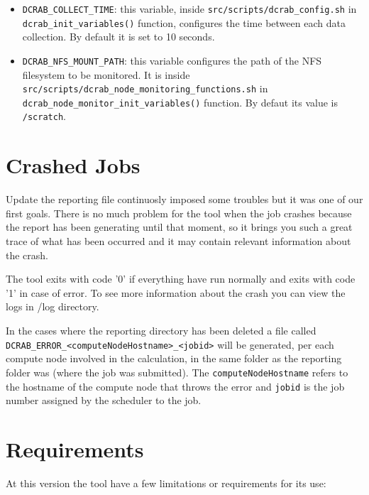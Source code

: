 \documentclass[10pt,a4paper]{report}
\begin{document}
\begin{itemize}
	\item \texttt{DCRAB\_COLLECT\_TIME}: this variable, inside \verb+src/scripts/dcrab_config.sh+ in \texttt{dcrab\_init\_variables()} function, configures the time between each data collection. By default it is set to 10 seconds.
	\item \texttt{DCRAB\_NFS\_MOUNT\_PATH}: this variable configures the path of the NFS filesystem to be monitored. It is inside \verb+src/scripts/dcrab_node_monitoring_functions.sh+ in \texttt{dcrab\_node\_monitor\_init\_variables()} function. By defaut its value is \verb+/scratch+.
\end{itemize}

\section{Crashed Jobs}
\label{crash}
Update the reporting file continuosly imposed some troubles but it was one of our first goals. There is no much problem for the tool when the job crashes because the report has been generating until that moment, so it brings you such a great trace of what has been occurred and it may contain relevant information about the crash.

The tool exits with code '0' if everything have run normally and exits with code '1' in case of error. To see more information about the crash you can view the logs in /log directory.

In the cases where the reporting directory has been deleted a file called \verb+DCRAB_ERROR_<computeNodeHostname>_<jobid>+ will be generated, per each compute node involved in the calculation, in the same folder as the reporting folder was (where the job was submitted). The \verb+computeNodeHostname+ refers to the hostname of the compute node that throws the error and \verb+jobid+ is the job number assigned by the scheduler to the job.

\section{Requirements}

At this version the tool have a few limitations or requirements for its use:
\end{document}
